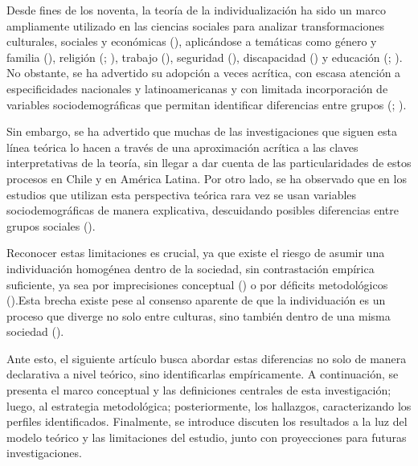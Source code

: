 \documentclass[
  letterpaper,
  DIV=11,
  numbers=noendperiod]{scrartcl}
\begin{document}
Desde fines de los noventa, la teoría de la individualización ha sido un
marco ampliamente utilizado en las ciencias sociales para analizar
transformaciones culturales, sociales y económicas
(), aplicándose a temáticas como
género y familia (),
religión (;
),
trabajo (),
seguridad (),
discapacidad () y educación (;
). No
obstante, se ha advertido su adopción a veces acrítica, con escasa
atención a especificidades nacionales y latinoamericanas y con limitada
incorporación de variables sociodemográficas que permitan identificar
diferencias entre grupos (;
).

Sin embargo, se ha advertido que muchas de las investigaciones que
siguen esta línea teórica lo hacen a través de una aproximación acrítica
a las claves interpretativas de la teoría, sin llegar a dar cuenta de
las particularidades de estos procesos en Chile y en América Latina. Por
otro lado, se ha observado que en los estudios que utilizan esta
perspectiva teórica rara vez se usan variables sociodemográficas de
manera explicativa, descuidando posibles diferencias entre grupos
sociales ().

Reconocer estas limitaciones es crucial, ya que existe el riesgo de
asumir una individuación homogénea dentro de la sociedad, sin
contrastación empírica suficiente, ya sea por imprecisiones conceptual
() o por déficits metodológicos
().Esta brecha existe pese
al consenso aparente de que la individuación es un proceso que diverge
no solo entre culturas, sino también dentro de una misma sociedad
().

Ante esto, el siguiente artículo busca abordar estas diferencias no solo
de manera declarativa a nivel teórico, sino identificarlas
empíricamente. A continuación, se presenta el marco conceptual y las
definiciones centrales de esta investigación; luego, al estrategia
metodológica; posteriormente, los hallazgos, caracterizando los perfiles
identificados. Finalmente, se introduce discuten los resultados a la luz
del modelo teórico y las limitaciones del estudio, junto con
proyecciones para futuras investigaciones.
\end{document}
